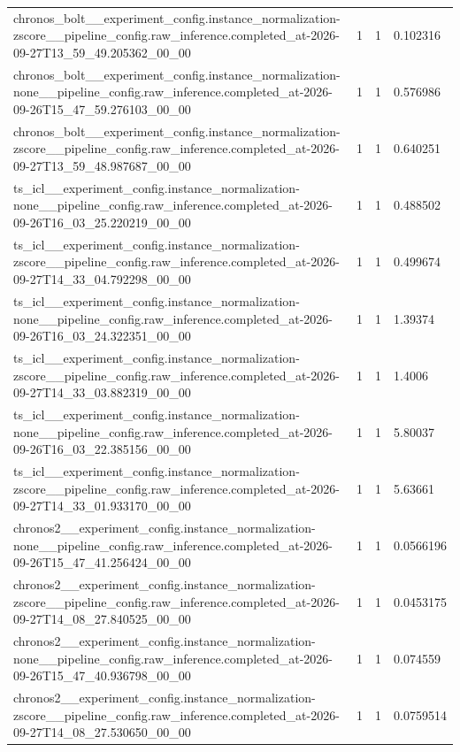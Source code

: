 \begin{tabular}{llll}
chronos\_bolt\_\_experiment\_config.instance\_normalization-zscore\_\_pipeline\_config.raw\_inference.completed\_at-2026-09-27T13\_59\_49.205362\_00\_00 & 1 & 1 & 0.102316 \\
chronos\_bolt\_\_experiment\_config.instance\_normalization-none\_\_pipeline\_config.raw\_inference.completed\_at-2026-09-26T15\_47\_59.276103\_00\_00 & 1 & 1 & 0.576986 \\
chronos\_bolt\_\_experiment\_config.instance\_normalization-zscore\_\_pipeline\_config.raw\_inference.completed\_at-2026-09-27T13\_59\_48.987687\_00\_00 & 1 & 1 & 0.640251 \\
ts\_icl\_\_experiment\_config.instance\_normalization-none\_\_pipeline\_config.raw\_inference.completed\_at-2026-09-26T16\_03\_25.220219\_00\_00 & 1 & 1 & 0.488502 \\
ts\_icl\_\_experiment\_config.instance\_normalization-zscore\_\_pipeline\_config.raw\_inference.completed\_at-2026-09-27T14\_33\_04.792298\_00\_00 & 1 & 1 & 0.499674 \\
ts\_icl\_\_experiment\_config.instance\_normalization-none\_\_pipeline\_config.raw\_inference.completed\_at-2026-09-26T16\_03\_24.322351\_00\_00 & 1 & 1 & 1.39374 \\
ts\_icl\_\_experiment\_config.instance\_normalization-zscore\_\_pipeline\_config.raw\_inference.completed\_at-2026-09-27T14\_33\_03.882319\_00\_00 & 1 & 1 & 1.4006 \\
ts\_icl\_\_experiment\_config.instance\_normalization-none\_\_pipeline\_config.raw\_inference.completed\_at-2026-09-26T16\_03\_22.385156\_00\_00 & 1 & 1 & 5.80037 \\
ts\_icl\_\_experiment\_config.instance\_normalization-zscore\_\_pipeline\_config.raw\_inference.completed\_at-2026-09-27T14\_33\_01.933170\_00\_00 & 1 & 1 & 5.63661 \\
chronos2\_\_experiment\_config.instance\_normalization-none\_\_pipeline\_config.raw\_inference.completed\_at-2026-09-26T15\_47\_41.256424\_00\_00 & 1 & 1 & 0.0566196 \\
chronos2\_\_experiment\_config.instance\_normalization-zscore\_\_pipeline\_config.raw\_inference.completed\_at-2026-09-27T14\_08\_27.840525\_00\_00 & 1 & 1 & 0.0453175 \\
chronos2\_\_experiment\_config.instance\_normalization-none\_\_pipeline\_config.raw\_inference.completed\_at-2026-09-26T15\_47\_40.936798\_00\_00 & 1 & 1 & 0.074559 \\
chronos2\_\_experiment\_config.instance\_normalization-zscore\_\_pipeline\_config.raw\_inference.completed\_at-2026-09-27T14\_08\_27.530650\_00\_00 & 1 & 1 & 0.0759514 \\

\end{tabular}
